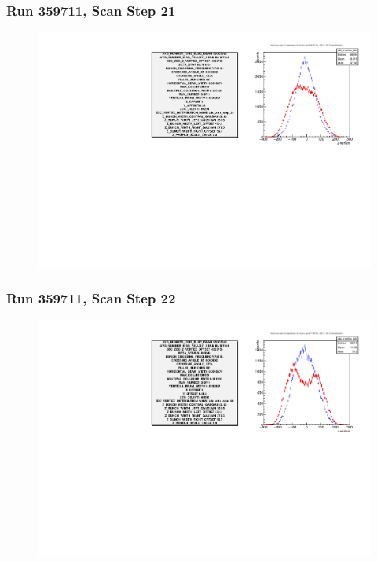 \begin{frame}
\frametitle{Run 359711, Scan Step 21}
\begin{figure}
\begin{center}
\includegraphics[width=\linewidth]{"figs/359711_step_21_zdc_zvertex"}
\caption{ }
\label{fig:359711_step_21_zdc_zvertex}
\end{center}\end{figure}
\end{frame}

\begin{frame}
\frametitle{Run 359711, Scan Step 22}
\begin{figure}
\begin{center}
\includegraphics[width=\linewidth]{"figs/359711_step_22_zdc_zvertex"}
\caption{ }
\label{fig:359711_step_22_zdc_zvertex}
\end{center}\end{figure}
\end{frame}

